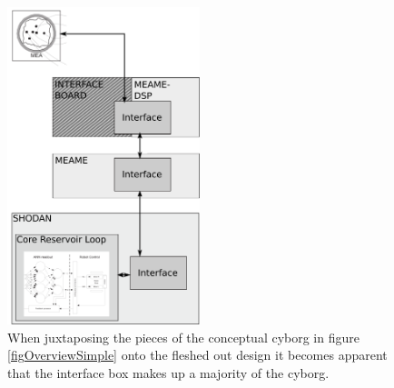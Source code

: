 \begin{figure}[h]
  \centering
  \includegraphics[width=0.5\textwidth]{fig/ConceptMap.png}
  \caption[Conceptual cyborg model compared with implemented]{
    When juxtaposing the pieces of the conceptual cyborg in figure
    \ref{figOverviewSimple} onto the fleshed out design it becomes apparent that the
    interface box makes up a majority of the cyborg.
  }
  \label{figJuxta}
\end{figure}
